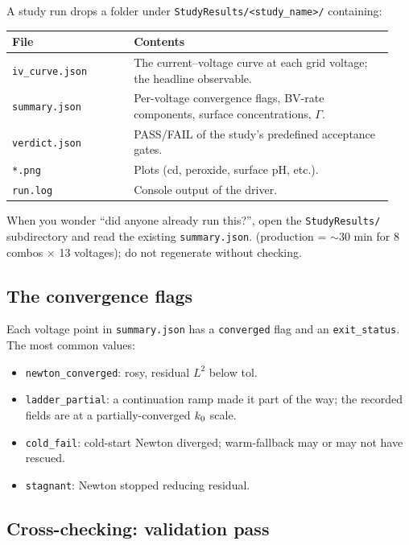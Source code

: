 \documentclass[11pt]{article}
\begin{document}
A study run drops a folder under \texttt{StudyResults/<study\_name>/}
containing:

\begin{center}
\begin{tabular}{p{0.30\linewidth} p{0.64\linewidth}}
\toprule
\textbf{File} & \textbf{Contents} \\
\midrule
\texttt{iv\_curve.json}     & The current--voltage curve at each grid voltage; the headline observable. \\
\texttt{summary.json}       & Per-voltage convergence flags, BV-rate components, surface concentrations, $\Gamma$. \\
\texttt{verdict.json}       & PASS/FAIL of the study's predefined acceptance gates. \\
\texttt{*.png}              & Plots (cd, peroxide, surface pH, etc.). \\
\texttt{run.log}            & Console output of the driver. \\
\bottomrule
\end{tabular}
\end{center}

When you wonder ``did anyone already run this?'', open the
\texttt{StudyResults/} subdirectory and read the existing
\texttt{summary.json}.  (production = $\sim 30$ min for 8 combos $\times$ 13
voltages); do not regenerate without checking.

\subsection{The convergence flags}

Each voltage point in \texttt{summary.json} has a
\texttt{converged} flag and an \texttt{exit\_status}. The most
common values:
\begin{itemize}[leftmargin=*]
\item \texttt{newton\_converged}: rosy, residual $L^2$ below tol.
\item \texttt{ladder\_partial}: a continuation ramp made it part of
      the way; the recorded fields are at a partially-converged
      $k_0$ scale.
\item \texttt{cold\_fail}: cold-start Newton diverged; warm-fallback
      may or may not have rescued.
\item \texttt{stagnant}: Newton stopped reducing residual.
\end{itemize}

\subsection{Cross-checking: validation pass}
\end{document}

